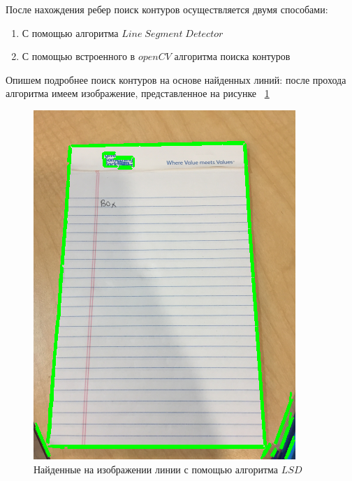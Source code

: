 После нахождения ребер поиск контуров осуществляется двумя способами:
\begin{enumerate}
    \item С помощью алгоритма $Line\;Segment\;Detector$ \cite{lsd}
    \item С помощью встроенного в $openCV$ алгоритма поиска контуров \cite{opencv_contours}
\end{enumerate}

Опишем подробнее поиск контуров на основе найденных линий: после прохода алгоритма имеем изображение, представленное на рисунке ~\ref{lsd_img}
\begin{figure}
    \includegraphics[scale=0.25]{img/perspective/lsd.png}
    \caption{Найденные на изображении линии с помощью алгоритма $LSD$}
    \label{lsd_img}
\end{figure}

